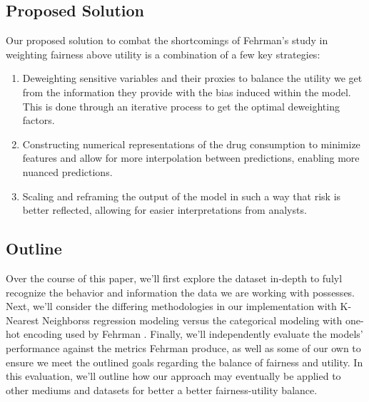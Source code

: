\documentclass{article}
\begin{document}
    
    \subsection*{Proposed Solution}
    Our proposed solution to combat the shortcomings of Fehrman's study in weighting fairness above utility is a combination of a few key strategies:
    \begin{enumerate}[I]
        \item Deweighting sensitive variables and their proxies to balance the utility we get from the information they provide with the bias induced within the model. This is done through an iterative process to get the optimal deweighting factors.
        \item Constructing numerical representations of the drug consumption to minimize features and allow for more interpolation between predictions, enabling more nuanced predictions.
        \item Scaling and reframing the output of the model in such a way that risk is better reflected, allowing for easier interpretations from analysts.
    \end{enumerate}
    

    \subsection*{Outline}
    Over the course of this paper, we'll first explore the dataset in-depth to fulyl recognize the behavior and information the data we are working with possesses. Next, we'll consider the differing methodologies in our implementation with K-Nearest Neighborss regression modeling versus the categorical modeling with one-hot encoding used by Fehrman \cite{Fehrman}. Finally, we'll independently evaluate the models' performance against the metrics Fehrman produce, as well as some of our own to ensure we meet the outlined goals regarding the balance of fairness and utility. In this evaluation, we'll outline how our approach may eventually be applied to other mediums and datasets for better a better fairness-utility balance.
    

\end{document}
